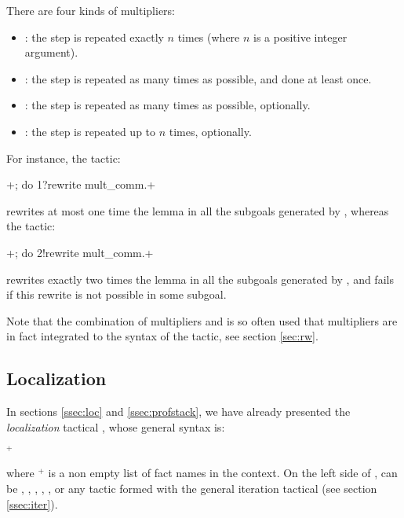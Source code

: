 There are four kinds of multipliers:
  \begin{itemize}
  \item {}: the step {\tac} is repeated exactly $n$ times
    (where $n$ is a positive integer argument).
  \item \ssrC{!}: the step {\tac} is repeated as many times as possible,
    and done at least once.
  \item {}: the step {\tac} is repeated as many times as possible,
    optionally.
  \item {}: the step {\tac} is repeated up to $n$ times,
    optionally.
  \end{itemize}

For instance, the tactic:

\begin{center}
 {\tac} \ssrL+; do 1?rewrite mult_comm.+
\end{center}

rewrites at most one time the lemma  in all the subgoals
generated by {\tac} , whereas the tactic:

\begin{center}
  {\tac} \ssrL+; do 2!rewrite mult_comm.+
\end{center}

rewrites exactly two times the lemma  in all the subgoals
generated by {\tac}, and fails if this rewrite is not possible
in some subgoal.

Note that the combination of multipliers and  is so often
used that multipliers are in fact integrated to the syntax of the \ssr{}
 tactic, see section \ref{sec:rw}.

\subsection{Localization}\label{ssec:gloc}

In sections \ref{ssec:loc} and \ref{ssec:profstack}, we have already
presented the \emph{localization} tactical , whose general
syntax is:
\begin{center}
        {\tac}  $^+$ \optional{\ssrC{*}}
\end{center}

where $^+$ is a non empty list of fact
names in the context. On the left side of , {\tac} can be
, , , , ,
 or any tactic formed with the general iteration tactical  (see
 section \ref{ssec:iter}).

